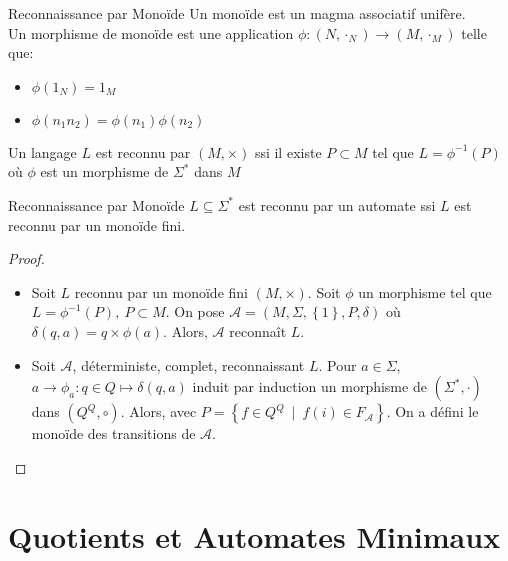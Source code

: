 \documentclass{cours}
\begin{document}
\begin{définition}{Reconnaissance par Monoïde}{}
    Un monoïde est un magma associatif unifère. \\
    Un morphisme de monoïde est une application $\phi : (N, \cdot_{N}) \rightarrow (M, \cdot_{M})$ telle que: \begin{itemize}
        \item $\phi(1_{N}) = 1_{M}$
        \item $\phi(n_{1}n_{2}) = \phi(n_{1})\phi(n_{2})$
    \end{itemize}
    Un langage $L$ est reconnu par $(M, \times)$ ssi il existe $P \subset M$ tel que $L = \phi^{-1}(P)$ où $\phi$ est un morphisme de $\Sigma^{*}$ dans $M$
\end{définition}

\begin{propositionfr}{Reconnaissance par Monoïde}{}
    $L\subseteq \Sigma^{*}$ est reconnu par un automate ssi $L$ est reconnu par un monoïde fini.
\end{propositionfr}
\begin{proof}
    \begin{itemize}
        \item Soit $L$ reconnu par un monoïde fini $(M, \times)$. Soit $\phi$ un morphisme tel que $L = \phi^{-1}(P), \ P\subset M$. On pose $\mathcal{A} = (M, \Sigma, \left\{1\right\}, P, \delta)$ où $\delta(q, a) = q \times \phi(a)$. Alors, $\mathcal{A}$ reconnaît $L$.
        \item Soit $\mathcal{A}$, déterministe, complet, reconnaissant $L$. Pour $a \in \Sigma$, $a \rightarrow \phi_{a} : q\in Q \mapsto \delta(q, a)$ induit par induction un morphisme de $(\Sigma^{*}, \cdot)$ dans $(Q^{Q}, \circ)$. Alors, avec $P = \left\{f \in Q^{Q}\ \mid \ f(i) \in F_{\mathcal{A}}\right\}$. On a défini le monoïde des transitions de $\mathcal{A}$.
    \end{itemize}
\end{proof}

\section{Quotients et Automates Minimaux}
\end{document}

